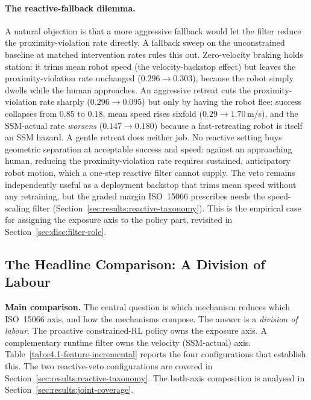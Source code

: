 \documentclass[11pt,a4paper]{report}
\newcommand{\ssm}{SSM}
\newcommand{\iso}{ISO~15066}
\begin{document}
\paragraph{The reactive-fallback dilemma.}
A natural objection is that a more aggressive fallback would let the
filter reduce the proximity-violation rate directly. A fallback sweep on the
unconstrained baseline at matched intervention rates rules this out.
Zero-velocity braking holds station: it trims mean robot speed (the
velocity-backstop effect) but leaves the proximity-violation rate unchanged
($0.296 \to 0.303$), because the robot simply dwells while the human
approaches. An aggressive retreat cuts the proximity-violation rate sharply
($0.296 \to 0.095$) but only by having the robot flee: success
collapses from $0.85$ to $0.18$, mean speed rises sixfold
($0.29 \to 1.70$\,m/s), and the \ssm{}-actual rate \emph{worsens}
($0.147 \to 0.180$) because a fast-retreating robot is itself an
\ssm{} hazard. A gentle retreat does neither job. No reactive
setting buys geometric separation at acceptable success and speed:
against an approaching human, reducing the proximity-violation rate requires sustained,
anticipatory robot motion, which a one-step reactive filter cannot
supply. The veto remains independently useful as a deployment
backstop that trims mean speed without any retraining, but the
graded margin \iso{} prescribes needs the speed-scaling filter
(Section~\ref{sec:results:reactive-taxonomy}). This is the empirical
case for assigning the exposure axis to the policy part, revisited in
Section~\ref{sec:disc:filter-role}.

\subsection{The Headline Comparison: A Division of Labour}
\label{sec:results:headline-feature-table}

\textbf{Main comparison.} The central question is which mechanism
reduces which \iso{} axis, and how the mechanisms compose. The answer
is a \emph{division of labour}. The proactive constrained-RL policy
owns the exposure axis. A complementary runtime filter owns
the velocity (\ssm{}-actual) axis.
Table~\ref{tab:e4.1-feature-incremental} reports the four
configurations that establish this. The two reactive-veto
configurations are covered in
Section~\ref{sec:results:reactive-taxonomy}. The both-axis composition
is analysed in Section~\ref{sec:results:joint-coverage}.
\end{document}
